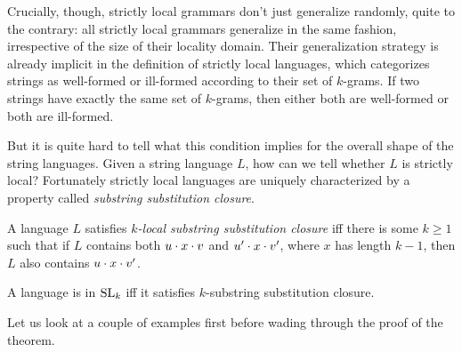 Crucially, though, strictly local grammars don't just generalize randomly, quite to the contrary: all strictly local grammars generalize in the same fashion, irrespective of the size of their locality domain.
Their generalization strategy is already implicit in the definition of strictly local languages, which categorizes strings as well-formed or ill-formed according to their set of $k$-grams.
If two strings have exactly the same set of $k$-grams, then either both are well-formed or both are ill-formed.

But it is quite hard to tell what this condition implies for the overall shape of the string languages.
Given a string language $L$, how can we tell whether $L$ is strictly local?
Fortunately strictly local languages are uniquely characterized by a property called \emph{substring substitution closure}.
%
\begin{definition}
    A language $L$ satisfies \emph{$k$-local substring substitution closure} iff there is some $k \geq 1$ such that if $L$ contains both $u \cdot x \cdot v$ and $u' \cdot x \cdot v'$, where $x$ has length $k - 1$, then $L$ also contains $u \cdot x \cdot v'$.
\end{definition}
%
\begin{theorem}
    A language is in $\mathrm{SL}_k$ iff it satisfies $k$-substring substitution closure.
\end{theorem}
%
Let us look at a couple of examples first before wading through the proof of the theorem.

